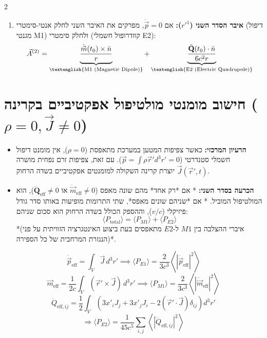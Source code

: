 \documentclass[10pt,a4paper]{article}
\begin{document}
\begin{multicols*}{2}
\begin{itemize}[leftmargin=*]
\begin{enumerate}
        \item \textbf{איבר הסדר השני ($r'^1$):} אם $\dot{\vec{p}} = 0$, מפרקים את האיבר השני לחלק אנטי-סימטרי (דיפול מגנטי \textenglish{M1}) ולחלק סימטרי (קוודרופול חשמלי \textenglish{E2}):
        $$\vec{A}^{(2)} = \underbrace{\frac{\dot{\vec{m}}(t_0) \times \hat{n}}{r}}_{\text{\textenglish{M1 (Magnetic Dipole)}}} + \underbrace{\frac{\ddot{\mathbf{Q}}(t_0) \cdot \hat{n}}{6 c^2 r}}_{\text{\textenglish{E2 (Electric Quadrupole)}}}$$
    \end{enumerate}

    
\end{itemize}

\section*{חישוב מומנטי מולטיפול אפקטיביים בקרינה ($\rho = 0, \vec{J} \neq 0$)}

\begin{itemize}[leftmargin=*]
    \item \textbf{הרעיון המרכזי:} 
    כאשר צפיפות המטען במערכת מתאפסת ($\rho = 0$), אין מומנט דיפול חשמלי סטנדרטי ($\vec{p} = \int \rho \vec{r}' d^3r' = 0$). עם זאת, צפיפות זרם נפחית מושרה $\vec{J}(\vec{r}', t)$ יוצרת קרינה השקולה למומנטים אפקטיביים בשדה הרחוק.

    

    \item \textbf{הכרעה בסדר השני:}
    * אם *רק אחד* מהם שונה מאפס ($\ddot{\vec{m}}_{\text{eff}} \neq 0$ או $\dddot{\mathbf{Q}}_{\text{eff}} \neq 0$), הוא המולטיפול המוביל.
    * אם *שניהם שונים מאפס*, שתי התרומות מופיעות באותו סדר גודל פיזיקלי ($v/c$), וההספק הכולל בשדה הרחוק הוא סכום שניהם:
      $$\langle P_{\text{total}} \rangle = \langle P_{M1} \rangle + \langle P_{E2} \rangle$$
      *(איברי ההצלבה בין $M1$ ל-$E2$ מתאפסים בעת ביצוע האינטגרציה הזוויתית על פני הנגזרת המרחבית של כל הספירה)*.
\end{itemize}
$$\dot{\vec{p}}_{\text{eff}} = \int_V \vec{J} \, d^3r' \implies \langle P_{E1} \rangle = \frac{2}{3c^3} \left\langle |\ddot{\vec{p}}_{\text{eff}}|^2 \right\rangle$$
$$\vec{m}_{\text{eff}} = \frac{1}{2c} \int_V (\vec{r}' \times \vec{J}) \, d^3r' \implies \langle P_{M1} \rangle = \frac{2}{3c^3} \left\langle |\ddot{\vec{m}}_{\text{eff}}|^2 \right\rangle$$
$$\dot{Q}_{\text{eff}, ij} = \frac{1}{2} \int_V \left( 3x'_i J_j + 3x'_j J_i - 2(\vec{r}' \cdot \vec{J})\delta_{ij} \right) d^3r'$$ $$ \Rightarrow \langle P_{E2} \rangle = \frac{1}{45c^5} \sum_{i,j} \left\langle |\dddot{Q}_{\text{eff}, ij}|^2 \right\rangle$$



\end{multicols*}
\end{document}
